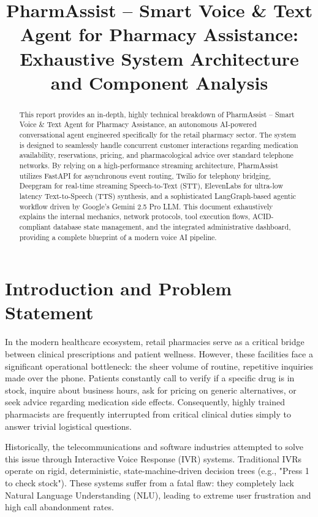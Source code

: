 \documentclass[conference]{IEEEtran}
\title{PharmAssist -- Smart Voice \& Text Agent for Pharmacy Assistance: \\
Exhaustive System Architecture and Component Analysis}
\author{
\IEEEauthorblockN{Mihir}
\IEEEauthorblockA{
M.Tech Major Project Report\\
Department of Computer Science\\
[University Name]\\
[City, Country]\\
email@domain.com}
}
\begin{document}
\maketitle

\begin{abstract}
This report provides an in-depth, highly technical breakdown of PharmAssist -- Smart Voice \& Text Agent for Pharmacy Assistance, an autonomous AI-powered conversational agent engineered specifically for the retail pharmacy sector. The system is designed to seamlessly handle concurrent customer interactions regarding medication availability, reservations, pricing, and pharmacological advice over standard telephone networks. By relying on a high-performance streaming architecture, PharmAssist utilizes FastAPI for asynchronous event routing, Twilio for telephony bridging, Deepgram for real-time streaming Speech-to-Text (STT), ElevenLabs for ultra-low latency Text-to-Speech (TTS) synthesis, and a sophisticated LangGraph-based agentic workflow driven by Google's Gemini 2.5 Pro LLM. This document exhaustively explains the internal mechanics, network protocols, tool execution flows, ACID-compliant database state management, and the integrated administrative dashboard, providing a complete blueprint of a modern voice AI pipeline.
\end{abstract}

\section{Introduction and Problem Statement}
In the modern healthcare ecosystem, retail pharmacies serve as a critical bridge between clinical prescriptions and patient wellness. However, these facilities face a significant operational bottleneck: the sheer volume of routine, repetitive inquiries made over the phone. Patients constantly call to verify if a specific drug is in stock, inquire about business hours, ask for pricing on generic alternatives, or seek advice regarding medication side effects. Consequently, highly trained pharmacists are frequently interrupted from critical clinical duties simply to answer trivial logistical questions. 

Historically, the telecommunications and software industries attempted to solve this issue through Interactive Voice Response (IVR) systems. Traditional IVRs operate on rigid, deterministic, state-machine-driven decision trees (e.g., "Press 1 to check stock"). These systems suffer from a fatal flaw: they completely lack Natural Language Understanding (NLU), leading to extreme user frustration and high call abandonment rates.
\end{document}
